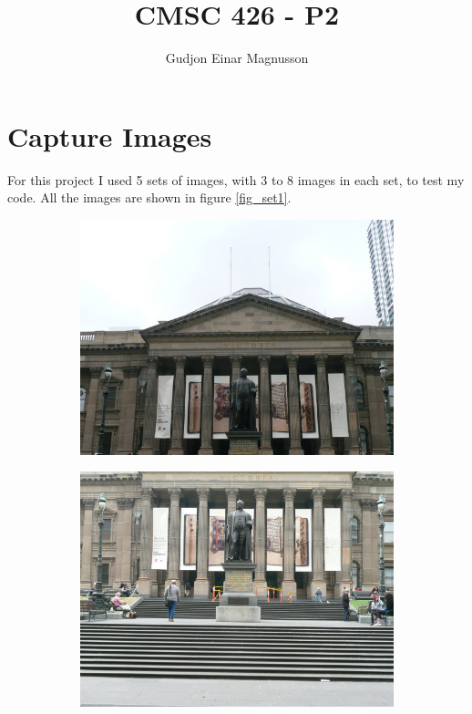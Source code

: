 \documentclass[12pt]{article}
\begin{document}
\title{CMSC 426 - P2}
\author{Gudjon Einar Magnusson}

\maketitle

\section{Capture Images} %
For this project I used 5 sets of images, with 3 to 8 images in each set, to test my code. All the images are shown in figure \ref{fig_set1}.

\begin{figure}[t!]
    \centering

    \begin{subfigure}[t]{0.3\textwidth}
        \centering
        \includegraphics[width=\linewidth]{../Images/Set1/1}
    \end{subfigure}
    \begin{subfigure}[t]{0.3\textwidth}
        \centering
        \includegraphics[width=\linewidth]{../Images/Set1/2}

\end{subfigure}
\end{figure}
\end{document}
